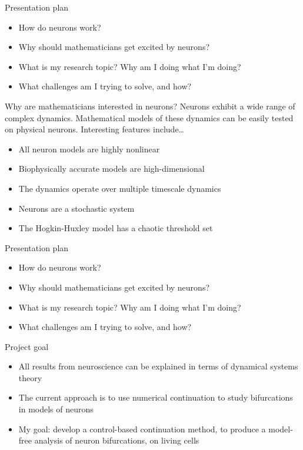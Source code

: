 \documentclass[aspectratio=169]{beamer}
\begin{document}
\begin{frame}[label={sec:org61c3a39}]{Presentation plan}
\begin{itemize}
    \item How do neurons work?
    \item \alert{Why should mathematicians get excited by neurons?}
\item What is my research topic? Why am I doing what I'm doing?
\item What challenges am I trying to solve, and how?
\end{itemize}
\end{frame}

\begin{frame}[label={sec:org2c662e7}]{Why are mathematicians interested in neurons?}
Neurons exhibit a wide range of complex dynamics.
Mathematical models of these dynamics can be easily tested on physical neurons.
Interesting features include\ldots{}
\begin{itemize}[<+->]
\item All neuron models are highly nonlinear
\item Biophysically accurate models are high-dimensional
\item The dynamics operate over multiple timescale dynamics
\item Neurons are a stochastic system
\item The Hogkin-Huxley model has a chaotic threshold set
\end{itemize}
\end{frame}


\begin{frame}[label={sec:org61c3a39}]{Presentation plan}
\begin{itemize}
    \item How do neurons work?
    \item Why should mathematicians get excited by neurons?
    \item \alert{What is my research topic? Why am I doing what I'm doing?}
\item What challenges am I trying to solve, and how?
\end{itemize}
\end{frame}

\begin{frame}{Project goal}
  \begin{itemize}[<+->]
    \item All results from neuroscience can be explained in terms of dynamical systems theory
    \item The current approach is to use numerical continuation to study bifurcations in models of neurons
    \item My goal: develop a control-based continuation method, to produce a model-free analysis of neuron bifurcations, on living cells
  \end{itemize}
\end{frame}
\end{document}
